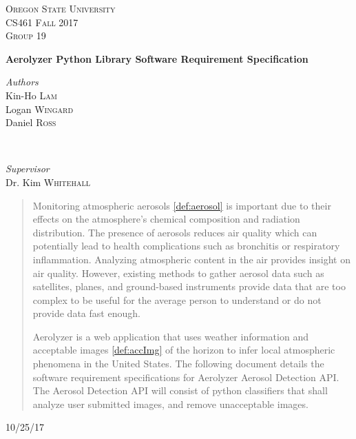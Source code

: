 \documentclass[journal,10pt,draftclsnofoot,onecolumn]{IEEEtran}
\begin{document}
	\begin{titlepage}

	\center

	\textsc{\LARGE Oregon State University}\\[1.5cm]
	\textsc{\Large CS461 Fall 2017 }\\[0.5cm]
	\textsc{\large Group 19}\\[0.5cm] %

	\vfill

	{\huge\bfseries Aerolyzer Python Library Software Requirement Specification}\\[0.4cm]

	\vfill

	\begin{minipage}{0.4\textwidth}
		\begin{flushleft}
			\large
			\textit{Authors}\\
			Kin-Ho \textsc{Lam}\\
			Logan \textsc{Wingard}\\
			Daniel \textsc{Ross}\\
		\end{flushleft}
	\end{minipage}
	~
	\begin{minipage}{0.4\textwidth}
		\begin{flushright}
			\large
			\textit{Supervisor}\\
			Dr. Kim \textsc{Whitehall}
		\end{flushright}
	\end{minipage}

	\vfill

	\begin{abstract}
		\begin{singlespace}
			Monitoring atmospheric aerosols \ref{def:aerosol} is important due to their effects on the atmosphere's chemical composition and radiation distribution.
			The presence of aerosols reduces air quality which can potentially lead to health complications such as bronchitis or respiratory inflammation.
			Analyzing atmospheric content in the air provides insight on air quality. 
			However, existing methods to gather aerosol data such as satellites, planes, and ground-based instruments provide data that are too complex to be useful for the average person to understand or do not provide data fast enough.


			Aerolyzer is a web application that uses weather information and acceptable images \ref{def:accImg} of the horizon to infer local atmospheric phenomena in the United States. 
			The following document details the software requirement specifications for Aerolyzer Aerosol Detection API. The Aerosol Detection API will consist of  python classifiers that shall analyze user submitted images, and remove unacceptable images.
		\end{singlespace}
	\end{abstract}

	\vfill
	\vfill
	\vfill
	{\large10/25/17}
	\vfill
\end{titlepage}
\end{document}
